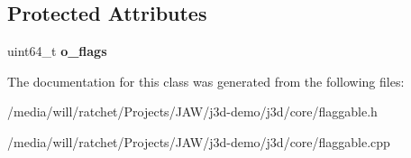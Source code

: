 \subsection*{Protected Attributes}
\begin{DoxyCompactItemize}
\item 
\hypertarget{classj3d_1_1core_1_1Flaggable_a933c2b776cf24091b0eee6c836f57f7a}{}uint64\+\_\+t {\bfseries o\+\_\+flags}\label{classj3d_1_1core_1_1Flaggable_a933c2b776cf24091b0eee6c836f57f7a}

\end{DoxyCompactItemize}


The documentation for this class was generated from the following files\+:\begin{DoxyCompactItemize}
\item 
/media/will/ratchet/\+Projects/\+J\+A\+W/j3d-\/demo/j3d/core/flaggable.\+h\item 
/media/will/ratchet/\+Projects/\+J\+A\+W/j3d-\/demo/j3d/core/flaggable.\+cpp\end{DoxyCompactItemize}
